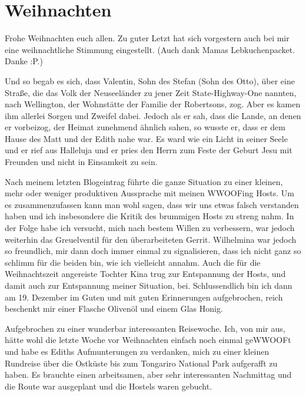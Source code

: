 \chapter{Weihnachten}

Frohe Weihnachten euch allen. Zu guter Letzt hat sich vorgestern auch
bei mir eine weihnachtliche Stimmung eingestellt. (Auch dank Mamas
Lebkuchenpacket. Danke :P.)

\begin{quoting}
Und so begab es sich, dass Valentin, Sohn des Stefan
(Sohn des Otto), über eine Straße, die das Volk der Neuseeländer zu
jener Zeit State-Highway-One nannten, nach Wellington, der Wohnstätte
der Familie der Robertsons, zog. Aber es kamen ihm allerlei Sorgen und
Zweifel dabei. Jedoch als er sah, dass die Lande, an denen er vorbeizog,
der Heimat zunehmend ähnlich sahen, so wusste er, dass er dem
Hause des Matt und der Edith nahe war. Es ward wie ein Licht in seiner
Seele und er rief aus Halleluja und er pries den Herrn zum Feste der
Geburt Jesu mit Freunden und nicht in Einsamkeit zu sein.
\end{quoting}

Nach meinem letzten Blogeintrag führte die ganze Situation zu einer
kleinen, mehr oder weniger produktiven Aussprache mit meinen WWOOFing
Hosts. Um es zusammenzufassen kann man wohl sagen, dass wir uns etwas
falsch verstanden haben und ich insbesondere die Kritik des brummigen
Hosts zu streng nahm. In der Folge habe ich versucht, mich nach bestem
Willen zu verbessern, war jedoch weiterhin das Greuelventil für den
überarbeiteten Gerrit. Wilhelmina war jedoch so freundlich, mir dann
doch immer einmal zu signalisieren, dass ich nicht ganz so schlimm für
die beiden bin, wie ich vielleicht annahm. Auch die für die
Weihnachtszeit angereiste Tochter Kina trug zur Entspannung der Hosts,
und damit auch zur Entspannung meiner Situation, bei. Schlussendlich bin
ich dann am 19. Dezember im Guten und mit guten Erinnerungen
aufgebrochen, reich beschenkt mir einer Flasche Olivenöl und einem Glas
Honig.

Aufgebrochen zu einer wunderbar interessanten Reisewoche. Ich, von mir
aus, hätte wohl die letzte Woche vor Weihnachten einfach noch einmal
geWWOOFt und habe es Ediths Aufmunterungen zu verdanken, mich zu einer
kleinen Rundreise über die Ostküste bis zum Tongariro National Park
aufgerafft zu haben. Es brauchte einen arbeitsamen, aber sehr
interessanten Nachmittag und die Route war ausgeplant und die Hostels
waren gebucht.

